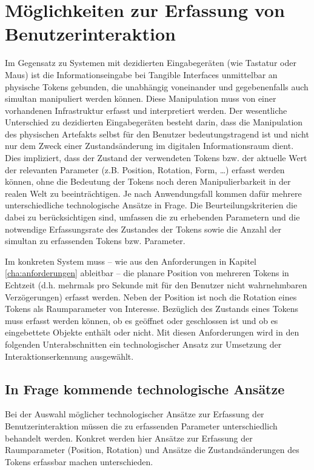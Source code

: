 \section{Möglichkeiten zur Erfassung von Benutzerinteraktion} %
\label{sec:möglichkeiten_zur_erfassung_von_benutzerinteraktion}

Im Gegensatz zu Systemen mit dezidierten Eingabegeräten (wie Tastatur oder Maus) ist die Informationseingabe bei Tangible Interfaces unmittelbar an physische Tokens gebunden, die unabhängig voneinander und gegebenenfalls auch simultan manipuliert werden können. Diese Manipulation muss von einer vorhandenen Infrastruktur erfasst und interpretiert werden. Der wesentliche Unterschied zu dezidierten Eingabegeräten besteht darin, dass die Manipulation des physischen Artefakts selbst für den Benutzer bedeutungstragend ist und nicht nur dem Zweck einer Zustandsänderung im digitalen Informationsraum dient. Dies impliziert, dass der Zustand der verwendeten Tokens bzw. der aktuelle Wert der relevanten Parameter (z.B. Position, Rotation, Form, \ldots) erfasst werden können, ohne die Bedeutung der Tokens noch deren Manipulierbarkeit in der realen Welt zu beeinträchtigen. Je nach Anwendungsfall kommen dafür mehrere unterschiedliche technologische Ansätze in Frage. Die Beurteilungskriterien die dabei zu berücksichtigen sind, umfassen die zu erhebenden Parametern und die notwendige Erfassungsrate des Zustandes der Tokens sowie die Anzahl der simultan zu erfassenden Tokens bzw. Parameter.

Im konkreten System muss -- wie aus den Anforderungen in Kapitel \ref{cha:anforderungen} ableitbar -- die planare Position von mehreren Tokens in Echtzeit (d.h. mehrmals pro Sekunde mit für den Benutzer nicht wahrnehmbaren Verzögerungen) erfasst werden. Neben der Position ist noch die Rotation eines Tokens als Raumparameter von Interesse. Bezüglich des Zustands eines Tokens muss erfasst werden können, ob es geöffnet oder geschlossen ist und ob es eingebettete Objekte enthält oder nicht. Mit diesen Anforderungen wird in den folgenden Unterabschnitten ein technologischer Ansatz zur Umsetzung der Interaktionserkennung ausgewählt.

\subsection{In Frage kommende technologische Ansätze} %
\label{sub:potentielle_technologische_ansätze}
Bei der Auswahl möglicher technologischer Ansätze zur Erfassung der Benutzerinteraktion müssen die zu erfassenden Parameter unterschiedlich behandelt werden. Konkret werden hier Ansätze zur Erfassung der Raumparameter (Position, Rotation) und Ansätze die Zustandsänderungen des Tokens erfassbar machen unterschieden. 

